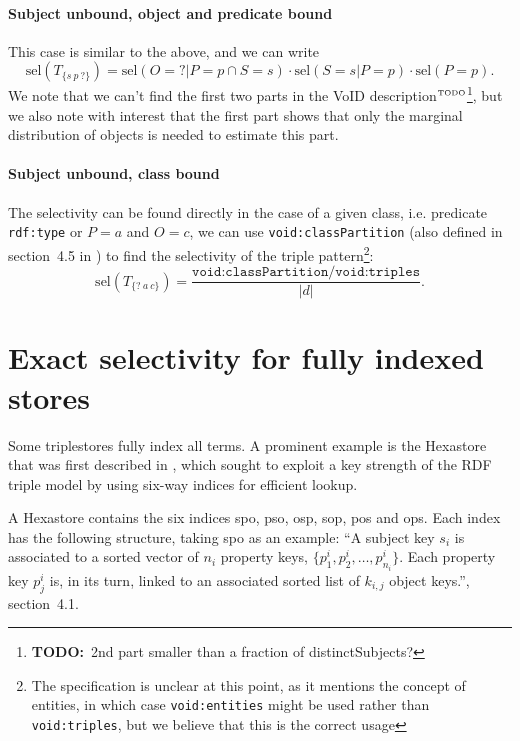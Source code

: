 \documentclass[12pt, draft]{article}
\newcommand{\rdfterm}[1]{\texttt{#1}}
\newcommand{\todo}[1]{\ensuremath{^{\textrm{\tiny{TODO}\normalsize}}}\footnote{\textbf{TODO:}~#1}}
\newcommand{\sel}[1]{\ensuremath{\mathrm{sel}\left(#1\right)}}
\begin{document}
\paragraph{Subject unbound, object and predicate bound}

This case is similar to the above, and we can write 
\begin{equation}\label{eq:selsuunobpb}
\sel{T_{\{s~p~?\}}} = \sel{O = ? | P = p \cap S = s} \cdot 
\sel{S = s | P = p} \cdot
\sel{P = p} . 
\end{equation}
We note that we can't find the first two parts in the VoID
description\todo{2nd part smaller than a fraction of distinctSubjects?}, but we also note with interest that the first part shows
that only the marginal distribution of objects is needed to estimate
this part.

\paragraph{Subject unbound, class bound}

The selectivity can be found directly in the case of a given class,
i.e. predicate \rdfterm{rdf:type} or $P = a$ and $O = c$, we can use
\rdfterm{void:classPartition} (also defined in section~4.5 in
\cite{voidnote}) to find the selectivity of the triple
pattern\footnote{The specification is unclear at this point, as it
 mentions the concept of entities, in which case
 \rdfterm{void:entities} might be used rather than
 \rdfterm{void:triples}, but we believe that this is the correct usage}:
\begin{equation}\label{eq:selSvPaOc}
 \sel{T_{\{?~a~c\}}} =
    \frac{\rdfterm{void:classPartition/void:triples}}{|d|} .
\end{equation}


\section{Exact selectivity for fully indexed stores}

Some triplestores fully index all terms. A prominent example is the
Hexastore that was first described in
\cite{Weiss:2008:HSI:1453856.1453965}, which sought to exploit a key
strength of the RDF triple model by using six-way indices for
efficient lookup.

A Hexastore contains the six indices \textsf{spo}, \textsf{pso},
\textsf{osp}, \textsf{sop}, \textsf{pos} and \textsf{ops}. Each index
has the following structure, taking \textsf{spo} as an example: ``A
subject key $s_i$ is associated to a sorted vector of $n_i$ property
keys, $\{p_1^i , p_2^i , \ldots , p^i_{n_i} \}$. Each property key $p_j^i$
is, in its turn, linked to an associated sorted list of $k_{i,j}$
object keys.''\cite{Weiss:2008:HSI:1453856.1453965}, section~4.1.
\end{document}
